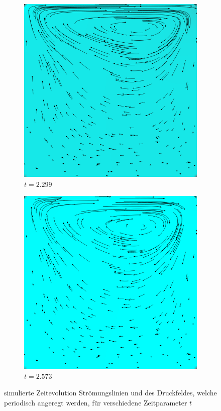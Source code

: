 \begin{figure}[!htb]
			\begin{subfigure}[b]{.5\textwidth}
				\includegraphics[scale = 0.28]{screenshots/periodic-02299.png}
				\caption{$t=2.299$}
			\end{subfigure}%
			\begin{subfigure}[b]{.5\textwidth}
				\includegraphics[scale = 0.28]{screenshots/periodic-02573.png}
				\caption{$t=2.573$}
			\end{subfigure}
			\caption{simulierte Zeitevolution Strömungslinien und des Druckfeldes, welche periodisch angeregt werden, für verschiedene Zeitparameter $t$}
			\label{fig:periodic 2}
		\end{figure}

